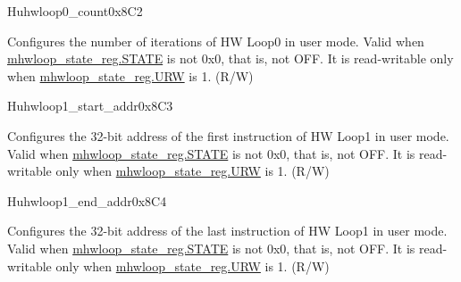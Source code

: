 \begin{register}{H}{uhwloop0\_count}{0x8C2}\label{regdesc:uhloop0_count}
%
%
\regnewline%
\begin{regdesc}\begin{reglist}
\label{fielddesc:UHWLP0_CNT}\item [Count] Configures the number of iterations of HW Loop0 in user mode. Valid when \hyperref[fielddesc:HWSTATE]{mhwloop\_state\_reg.STATE} is not 0x0, that is, not OFF. It is read-writable only when \hyperref[fielddesc:HWSTATE]{mhwloop\_state\_reg.URW} is 1. (R/W)
\end{reglist}\end{regdesc}
\end{register}

\begin{register}{H}{uhwloop1\_start\_addr}{0x8C3}\label{regdesc:uhloop1_start_addr}
%
\regnewline%
\begin{regdesc}\begin{reglist}
\label{fielddesc:UHWLP1_SA}\item [SA] Configures the 32-bit address of the first instruction of HW Loop1 in user mode. Valid when \hyperref[fielddesc:HWSTATE]{mhwloop\_state\_reg.STATE} is not 0x0, that is, not OFF. It is read-writable only when \hyperref[fielddesc:HWSTATE]{mhwloop\_state\_reg.URW} is 1. (R/W)
\end{reglist}\end{regdesc}
\end{register}

\begin{register}{H}{uhwloop1\_end\_addr}{0x8C4}\label{regdesc:uhloop1_end_addr}
%
\regnewline%
\begin{regdesc}\begin{reglist}
\label{fielddesc:UHWLP1_EA}\item [EA] Configures the 32-bit address of the last instruction of HW Loop1 in user mode. Valid when \hyperref[fielddesc:HWSTATE]{mhwloop\_state\_reg.STATE} is not 0x0, that is, not OFF. It is read-writable only when \hyperref[fielddesc:HWSTATE]{mhwloop\_state\_reg.URW} is 1. (R/W)
\end{reglist}\end{regdesc}
\end{register}


